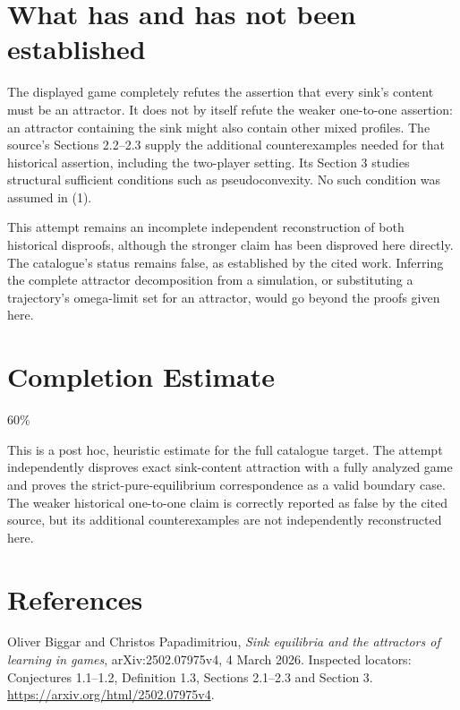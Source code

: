 \documentclass[11pt]{article}
\begin{document}
\section*{What has and has not been established}
The displayed game completely refutes the assertion that every sink's
content must be an attractor. It does not by itself refute the weaker
one-to-one assertion: an attractor containing the sink might also
contain other mixed profiles. The source's Sections 2.2--2.3 supply
the additional counterexamples needed for that historical assertion,
including the two-player setting. Its Section 3 studies structural
sufficient conditions such as pseudoconvexity. No such condition was
assumed in (1).

This attempt remains an incomplete independent reconstruction of both
historical disproofs, although the stronger claim has been disproved
here directly. The catalogue's status remains false, as established
by the cited work. Inferring the complete attractor decomposition from
a simulation, or substituting a trajectory's omega-limit set for an
attractor, would go beyond the proofs given here.

\section{Completion Estimate}
60\%

This is a post hoc, heuristic estimate for the full catalogue target.
The attempt independently disproves exact sink-content attraction with a fully analyzed game and proves the strict-pure-equilibrium correspondence as a valid boundary case. The weaker historical one-to-one claim is correctly reported as false by the cited source, but its additional counterexamples are not independently reconstructed here.

\section*{References}
Oliver Biggar and Christos Papadimitriou, \emph{Sink equilibria and the
attractors of learning in games}, arXiv:2502.07975v4, 4 March 2026.
Inspected locators: Conjectures 1.1--1.2, Definition 1.3,
Sections 2.1--2.3 and Section 3.
\url{https://arxiv.org/html/2502.07975v4}.
\end{document}

